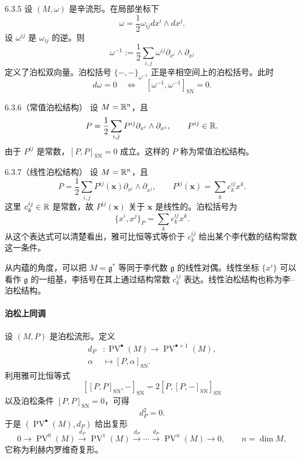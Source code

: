 \begin{example}{6.3.5}
  设 $(M,\omega)$ 是辛流形。在局部坐标下
  \[
  \omega=\frac12\omega_{ij}dx^i\wedge dx^j.
  \]
  设 $\omega^{ij}$ 是 $\omega_{ij}$ 的逆。则
  \[
  \omega^{-1}:=\frac12\sum_{i,j}\omega^{ij}\partial_{x^i}\wedge\partial_{x^j}
  \]
  定义了泊松双向量。泊松括号 $\{-,-\}_{\omega^{-1}}$ 正是辛相空间上的泊松括号。此时
  \[
  d\omega=0\quad\Longleftrightarrow\quad[\omega^{-1},\omega^{-1}]_{\mathrm{SN}}=0.
  \]
\end{example}

\begin{example}{6.3.6（常值泊松结构）}
  设 $M=\mathbb{R}^n$，且
  \[
  P=\frac12\sum_{i,j}P^{ij}\partial_{x^i}\wedge\partial_{x^j},
  \qquad P^{ij}\in\mathbb{R}.
  \]
  由于 $P^{ij}$ 是常数，$[P,P]_{\mathrm{SN}}=0$ 成立。这样的 $P$ 称为常值泊松结构。
\end{example}

\begin{example}{6.3.7（线性泊松结构）}
  设 $M=\mathbb{R}^n$，且
  \[
  P=\frac12\sum_{i,j}P^{ij}(\mathbf x)\partial_{x^i}\wedge\partial_{x^j},
  \qquad P^{ij}(\mathbf x)=\sum_k c_k^{ij}x^k.
  \]
  这里 $c_k^{ij}\in\mathbb{R}$ 是常数，故 $P^{ij}(\mathbf x)$ 关于 $\mathbf x$ 是线性的。泊松括号为
  \[
  \{x^i,x^j\}_P=\sum_k c_k^{ij}x^k.
  \]
  从这个表达式可以清楚看出，雅可比恒等式等价于 $c_k^{ij}$ 给出某个李代数的结构常数这一条件。

  从内蕴的角度，可以把 $M=\mathfrak g^*$ 等同于李代数 $\mathfrak g$ 的线性对偶。线性坐标 $\{x^i\}$ 可以看作 $\mathfrak g$ 的一组基，李括号在其上通过结构常数 $c_k^{ij}$ 表达。线性泊松结构也称为李–泊松结构。
\end{example}

\paragraph{泊松上同调}\par

设 $(M,P)$ 是泊松流形。定义
\begin{align*}
d_P&:\operatorname{PV}^\bullet(M)\longrightarrow\operatorname{PV}^{\bullet+1}(M),\\
\alpha&\longmapsto[P,\alpha]_{\mathrm{SN}}.
\end{align*}
利用雅可比恒等式
\[
[[P,P]_{\mathrm{SN}},-]_{\mathrm{SN}}=2[P,[P,-]_{\mathrm{SN}}]_{\mathrm{SN}}
\]
以及泊松条件 $[P,P]_{\mathrm{SN}}=0$，可得
\[
d_P^2=0.
\]
于是 $(\operatorname{PV}^\bullet(M),d_P)$ 给出复形
\[
0\longrightarrow\operatorname{PV}^0(M)\xrightarrow{d_P}\operatorname{PV}^1(M)
\xrightarrow{d_P}\cdots\xrightarrow{d_P}\operatorname{PV}^n(M)\longrightarrow0,
\qquad n=\dim M,
\]
它称为利赫内罗维奇复形。

